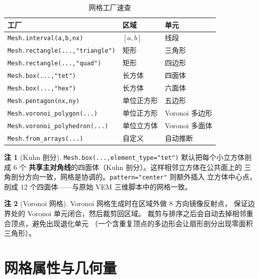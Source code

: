 \documentclass[UTF8,11pt,oneside]{ctexbook}
\theoremstyle{definition}
\newtheorem{remark}{注}[chapter]
\theoremstyle{plain}
\newcommand{\code}[1]{\texttt{#1}}
\begin{document}
\begin{table}[htbp]
\centering
\caption{网格工厂速查}
\label{tab:mesh-factories}
\begin{lrbox}{\guideTableBox}
\begin{tabular}{@{}L{6.4cm}L{1.9cm}L{6.3cm}@{}}
\toprule
工厂 & 区域 & 单元 \\
\midrule
\code{Mesh.interval(a,\allowbreak b,\allowbreak nx)} & $[a,b]$ & 线段 \\
\code{Mesh.rectangle(...,\allowbreak "triangle")} & 矩形 & 三角形 \\
\code{Mesh.rectangle(...,\allowbreak "quad")} & 矩形 & 四边形 \\
\code{Mesh.box(...,\allowbreak "tet")} & 长方体 & 四面体 \\
\code{Mesh.box(...,\allowbreak "hex")} & 长方体 & 六面体 \\
\code{Mesh.pentagon(nx,\allowbreak ny)} & 单位正方形 & 五边形 \\
\code{Mesh.voronoi\_\allowbreak polygon(...)} & 单位正方形 & Voronoi 多边形 \\
\code{Mesh.voronoi\_\allowbreak polyhedron(...)} & 单位立方体 & Voronoi 多面体 \\
\code{Mesh.from\_\allowbreak arrays(...)} & 自定义 & 自动推断 \\
\bottomrule
\end{tabular}
\end{lrbox}%
\ifdim\wd\guideTableBox>\linewidth
  \resizebox{\linewidth}{!}{\usebox{\guideTableBox}}%
\else\usebox{\guideTableBox}\fi
\end{table}

\begin{remark}[Kuhn 剖分]
\code{Mesh.box(...,\allowbreak element\_\allowbreak type="tet")} 默认把每个小立方体剖成 6 个
\textbf{共享主对角线}的四面体（Kuhn 剖分）。这样相邻立方体在公共面上的
三角剖分方向一致，网格是协调的。\code{pattern="center"} 则额外插入
立方体中心点，剖成 12 个四面体——与原始 VEM 三维脚本中的网格一致。
\end{remark}

\begin{remark}[Voronoi 网格]
Voronoi 网格生成时在区域外做 8 方向镜像反射点，
保证边界处的 Voronoi 单元闭合，然后裁剪回区域。
裁剪与排序之后会自动去掉相邻重合顶点，避免出现退化单元
（一个含重复顶点的多边形会让扇形剖分出现零面积三角形）。
\end{remark}

\section{网格属性与几何量}
\end{document}
